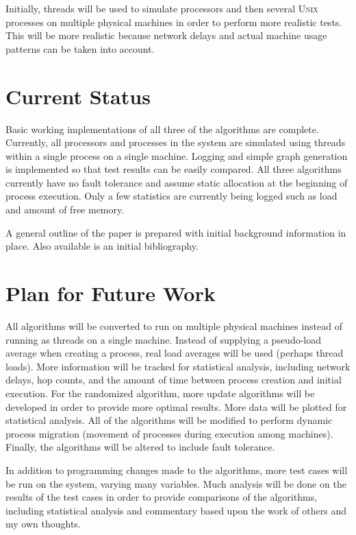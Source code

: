 \documentclass{article}
\newcommand{\UNIX}{\textsc{Unix}\xspace}
\begin{document}
Initially, threads will be used to simulate processors and then several
\UNIX processes on multiple physical machines in order to perform more
realistic tests.  This will be more realistic because network delays and
actual machine usage patterns can be taken into account.


\section{Current Status}

Basic working implementations of all three of the algorithms are complete.
Currently, all processors and processes in the system are simulated using
threads within a single process on a single machine.  Logging and simple
graph generation is implemented so that test results can be easily
compared.  All three algorithms currently have no fault tolerance and assume
static allocation at the beginning of process execution.  Only a few
statistics are currently being logged such as load and amount of free
memory.

A general outline of the paper is prepared with initial background
information in place.  Also available is an initial bibliography.


\section{Plan for Future Work}

All algorithms will be converted to run on multiple physical machines
instead of running as threads on a single machine.  Instead of supplying a
pseudo-load average when creating a process, real load averages will be used
(perhaps thread loads).  More information will be tracked for statistical
analysis, including network delays, hop counts, and the amount of time
between process creation and initial execution.  For the randomized
algorithm, more update algorithms will be developed in order to provide more
optimal results.  More data will be plotted for statistical analysis.  All
of the algorithms will be modified to perform dynamic process migration
(movement of processes during execution among machines).  Finally, the
algorithms will be altered to include fault tolerance.

In addition to programming changes made to the algorithms, more test cases
will be run on the system, varying many variables.  Much analysis will be
done on the results of the test cases in order to provide comparisons of the
algorithms, including statistical analysis and commentary based upon the
work of others and my own thoughts.  
\end{document}
